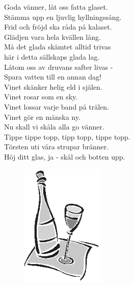 \documentclass[a6paper,10pt]{article}
\begin{document}
\setlength{\oddsidemargin}{-0.47in}
\noindent
\begin{center}
\end{center}
\begin{lyrics}
Goda vänner, låt oss fatta glaset.\\
Stämma upp en ljuvlig hyllningssång.\\
Frid och fröjd ska råda på kalaset.\\
Glädjen vara hela kvällen lång.
\vspace{5pt}\\
Må det glada skämtet alltid trivas\\
här i detta sällskaps glada lag.\\
Låtom oss av druvans safter livas -\\
Spara vatten till en annan dag!
\vspace{5pt}\\
Vinet skänker helig eld i själen.\\
Vinet rosar som en sky.\\
Vinet lossar varje band på trälen.\\
Vinet gör en mänska ny.
\vspace{5pt}\\
Nu skall vi skåla alla go vänner.\\
Tippe tippe topp, tipp topp, tippe topp.\\
Törsten uti våra strupar bränner.\\
Höj ditt glas, ja - skål och botten upp. 
\end{lyrics}
\begin{figure}[!h]
\hfill
\includegraphics[width=0.35\textwidth]{wine.png}
\end{figure}
\end{document}

